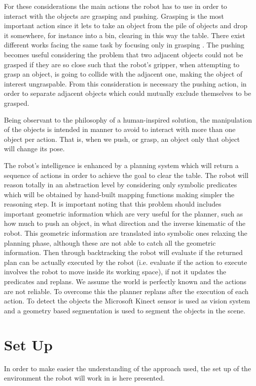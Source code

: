 For these considerations the main actions the robot has to use in order to interact with the objects are grasping and pushing.
Grasping is the most important action since it lets to take an object from the pile of objects and drop it somewhere, for instance into a bin, clearing in this way the table. There exist different works facing the same task by focusing only in grasping \citep{haf} \citep{AGILE}. The pushing becomes useful considering the problem that two adjacent objects could not be grasped if they are so close such that the robot's gripper, when attempting to grasp an object, is going to collide with the adjacent one, making the object of interest ungraspable. From this consideration is necessary the pushing action, in order to separate adjacent objects which could mutually exclude themselves to be grasped. 

Being observant to the philosophy of a human-inspired solution, the manipulation of the objects is intended in manner to avoid to interact with more than one object per action. That is, when we push, or grasp, an object only that object will change its pose. 

The robot's intelligence is enhanced by a planning system  which will return a sequence of actions in order to achieve the goal to clear the table. 
The robot will reason totally in an abstraction level by considering only symbolic predicates which will be obtained by hand-built mapping functions making simpler the reasoning step. It is important noting that this problem should includes important geometric information which are very useful for the planner, such as how much to push an object, in what direction and the inverse kinematic of the robot. This geometric information are translated into symbolic ones relaxing the planning phase, although these are not able to catch all the geometric information. Then through backtracking the robot will evaluate if the returned plan can be actually executed by the robot (i.e. evaluate if the action to execute involves the robot to move inside its working space), if not it updates the predicates and replans. 
We assume the world is perfectly known and the actions are not reliable. To overcome this the planner replans after the execution of each action.  
To detect the objects the Microsoft Kinect sensor is used as vision system and a geometry based segmentation is used to segment the objects in the scene.

\section{Set Up}
In order to make easier the understanding of the approach used, the set up of the environment the robot will work in is here presented. 

